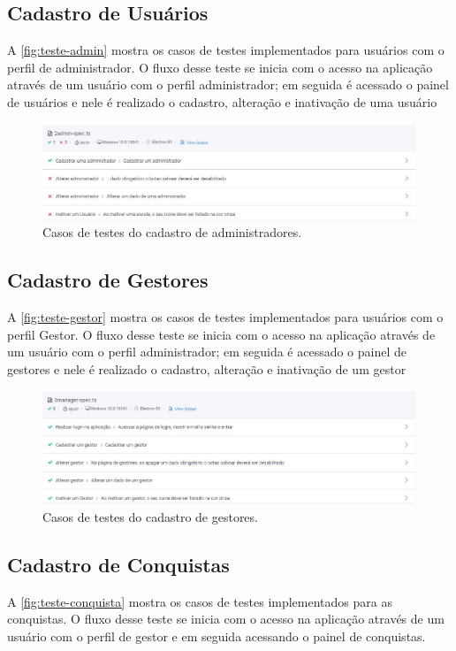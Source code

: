 \documentclass[
    12pt,               %
    openright,          %
    oneside,
    a4paper,            %
    english,            %
    brazil              %
    ]{ifsp-spo-inf-ctds} %
\begin{document}
\subsection{Cadastro de Usuários}
A \autoref{fig:teste-admin} mostra os casos de testes implementados para usuários com o perfil de administrador. O fluxo desse teste se inicia com o acesso na aplicação através de um usuário com o perfil administrador; em seguida é acessado o painel de usuários e nele é realizado o cadastro, alteração e inativação de uma usuário

\begin{figure}[htb]
    \centering
	\includegraphics[width=16cm]{imagens/TesteAdmin.JPG}
	\caption{\label{fig:teste-admin} Casos de testes do cadastro de administradores.}
\end{figure}

\subsection{Cadastro de Gestores}
A \autoref{fig:teste-gestor} mostra os casos de testes implementados para usuários com o perfil Gestor. O fluxo desse teste se inicia com o acesso na aplicação através de um usuário com o perfil administrador; em seguida é acessado o painel de gestores e nele é realizado o cadastro, alteração e inativação de um gestor

\begin{figure}[htb]
    \centering
	\includegraphics[width=16cm]{imagens/TestesGestor.JPG}
	\caption{\label{fig:teste-gestor} Casos de testes do cadastro de gestores.}
\end{figure}


\subsection{Cadastro de Conquistas}
A \autoref{fig:teste-conquista} mostra os casos de testes implementados para as conquistas. O fluxo desse teste se inicia com o acesso na aplicação através de um usuário com o perfil de gestor e em seguida acessando o painel de  conquistas. 
\end{document}
